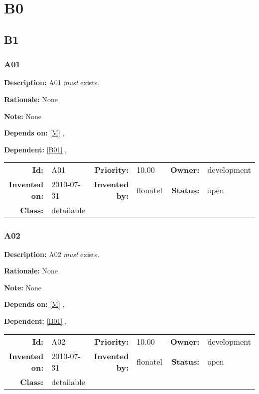 \chapter{B0}
\section{B1}
\subsection{A01}\label{A01}
\textbf{Description:} A01 \textsl{must} exists.

\textbf{Rationale:} None

\textbf{Note:} None

\textbf{Depends on:} \ref{M} , 

\textbf{Dependent:} \ref{B01} , 

\par
{\small \begin{center}\begin{tabular}{rlrlrl}
\textbf{Id:} & A01 & \textbf{Priority:} & 10.00 & \textbf{Owner:} & development \\ 
\textbf{Invented on:} & 2010-07-31 & \textbf{Invented by:} & flonatel & \textbf{Status:} & open \\ 
\textbf{Class:} & detailable & & & & \\ 
\end{tabular}\end{center} }%
\subsection{A02}\label{A02}
\textbf{Description:} A02 \textsl{must} exists.

\textbf{Rationale:} None

\textbf{Note:} None

\textbf{Depends on:} \ref{M} , 

\textbf{Dependent:} \ref{B01} , 

\par
{\small \begin{center}\begin{tabular}{rlrlrl}
\textbf{Id:} & A02 & \textbf{Priority:} & 10.00 & \textbf{Owner:} & development \\ 
\textbf{Invented on:} & 2010-07-31 & \textbf{Invented by:} & flonatel & \textbf{Status:} & open \\ 
\textbf{Class:} & detailable & & & & \\ 
\end{tabular}\end{center} }%
